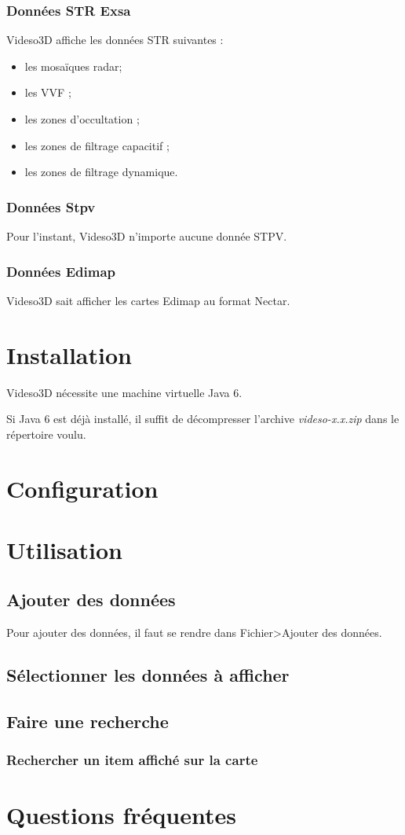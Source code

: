 \documentclass[a4paper, titlepage]{article}
\begin{document}
\subsubsection{Données STR Exsa}
Videso3D affiche les données STR suivantes :
\begin{itemize}
  \item les mosaïques radar;
  \item les VVF ;
  \item les zones d'occultation ;
  \item les zones de filtrage capacitif ;
  \item les zones de filtrage dynamique.
\end{itemize}
\subsubsection{Données Stpv}
Pour l'instant, Videso3D n'importe aucune donnée STPV.
\subsubsection{Données Edimap}
Videso3D sait afficher les cartes Edimap au format Nectar.
\section{Installation}
Videso3D nécessite une machine virtuelle Java 6.

Si Java 6 est déjà installé, il suffit de décompresser l'archive
\emph{videso-x.x.zip} dans le répertoire voulu.

\section{Configuration}


\section{Utilisation}
\subsection{Ajouter des données}
Pour ajouter des données, il faut se rendre dans Fichier>Ajouter des données.
\subsection{Sélectionner les données à afficher}

\subsection{Faire une recherche}
\subsubsection{Rechercher un item affiché sur la carte}
\section{Questions fréquentes}
\end{document}
